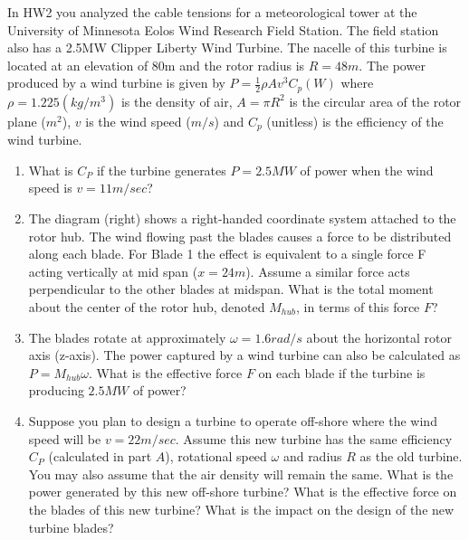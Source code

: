
In HW2 you analyzed the cable tensions for a meteorological tower at the University of Minnesota Eolos Wind
Research Field Station. The field station also has a 2.5MW Clipper Liberty Wind Turbine. The nacelle of this
turbine is located at an elevation of 80m and the rotor radius is $R = 48m$. The power produced by a wind
turbine is given by $P = \frac{1}{2}\rho A v^3 C_p (W)$ where $\rho = 1.225 (kg/m^3)$ is the density of air, $A = \pi R^2$ is the circular
area of the rotor plane ($m^2$), $v$ is the wind speed ($m/s$) and $C_p$ (unitless) is the efficiency of the wind turbine.
\begin{enumerate}
  \item What is $C_P$ if the turbine generates $P = 2.5MW$ of power when the wind speed is $v = 11 m/sec$?
  \item The diagram (right) shows a right-handed coordinate system attached to the rotor hub. The wind flowing
past the blades causes a force to be distributed along each blade. For Blade 1 the effect is equivalent to a
single force F acting vertically at mid span ($x = 24m$). Assume a similar force acts perpendicular to the
other blades at midspan. What is the total moment about the center of the rotor hub, denoted $M_{hub}$, in
terms of this force $F$?
  \item The blades rotate at approximately $\omega = 1.6 rad/s$ about the horizontal rotor axis (z-axis). The power 
captured by a wind turbine can also be calculated as $P = M_{hub} \omega$. What is the effective force $F$ on each
blade if the turbine is producing $2.5 MW$ of power?
  \item Suppose you plan to design a turbine to operate off-shore where the wind speed will be $v = 22 m/sec$.
Assume this new turbine has the same efficiency $C_P$ (calculated in part $A$), rotational speed $\omega$ and radius
$R$ as the old turbine. You may also assume that the air density will remain the same. What is the power
generated by this new off-shore turbine? What is the effective force on the blades of this new turbine?
What is the impact on the design of the new turbine blades?
\end{enumerate}


